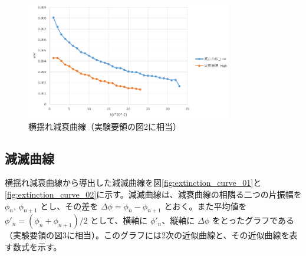 \documentclass[dvipdfmx,a4paper]{jreport} %
\begin{document}
 \begin{figure}[H] %
     \centering
     \includegraphics[width=0.8\textwidth]{summer/ship-experiment/long-pool/damping_curve_processed.png} %
     \caption{横揺れ減衰曲線（実験要領の図2に相当）}
     \label{fig:damping_curve_processed}
 \end{figure}

\subsection{減滅曲線}
横揺れ減衰曲線から導出した減滅曲線を図\ref{fig:extinction_curve_01}と\ref{fig:extinction_curve_02}に示す。減滅曲線は、減衰曲線の相隣る二つの片振幅を $\phi_n$, $\phi_{n+1}$ とし、その差を $\Delta\phi = \phi_n - \phi_{n+1}$ とおく。また平均値を $\phi'_n = (\phi_n + \phi_{n+1})/2$ として、横軸に $\phi'_n$、縦軸に $\Delta\phi$ をとったグラフである（実験要領の図3に相当）。このグラフには2次の近似曲線と、その近似曲線を表す数式を示す。
\end{document}
